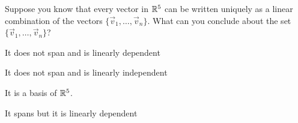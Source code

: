 \begin{readinessAssuranceTest}
\setcounter{enumi}{30}


\item Suppose you know that every vector in \(\mathbb{R}^5\) can be written uniquely as a linear combination of the vectors \(\{\vec{v}_1, \ldots, \vec{v}_n\}\).  What can you conclude about the set \(\{\vec{v}_1, \ldots, \vec{v}_n\}\)?
\begin{readinessAssuranceTestChoices}
\item It does not span and is linearly dependent
\item It does not span and is linearly independent
\item It is a basis of \(\mathbb{R}^5\).
\item It spans but it is linearly dependent
\end{readinessAssuranceTestChoices}

\end{readinessAssuranceTest}
